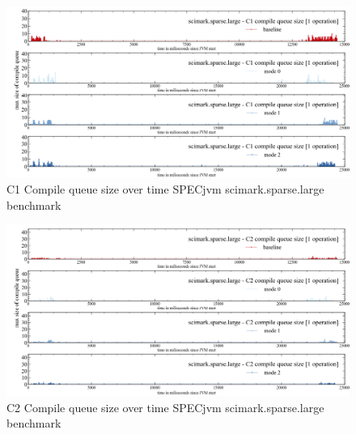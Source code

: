 \begin{figure}[ht]
  \begin{center}
    \centering
    \includegraphics[width=1.0\textwidth]{figures/spec_queue_scirmarksparselarge_separate_c1.png}
    \caption{C1 Compile queue size over time SPECjvm scimark.sparse.large benchmark}
    \label{f:spec_queue_scirmarksparselarge_separate_c1}
  \end{center}
\end{figure}
\begin{figure}[ht]
  \begin{center}
    \centering
    \includegraphics[width=1.0\textwidth]{figures/spec_queue_scirmarksparselarge_separate_c2.png}
    \caption{C2 Compile queue size over time SPECjvm scimark.sparse.large benchmark}
    \label{f:spec_queue_scirmarksparselarge_separate_c2}
  \end{center}
\end{figure}
